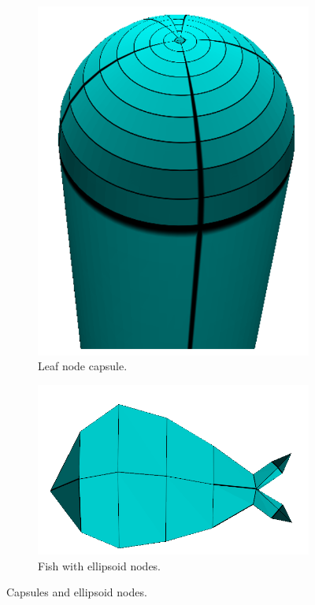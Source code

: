 \begin{figure}[h]
        \centering
        \begin{subfigure}[b]{0.25\textwidth}
        	\centering
                \includegraphics[height=\textwidth]{images/capsule.png}
                \caption{Leaf node capsule.}
                \label{fig:caps}
        \end{subfigure}%
        \qquad %
        \begin{subfigure}[b]{0.4\textwidth}
        	\centering
                \includegraphics[width=\textwidth]{images/ryba_mesh.png}
                \caption{Fish with ellipsoid nodes.}
                \label{fig:fish}
        \end{subfigure}
        \caption[Capsules and ellipsoid nodes]{Capsules and ellipsoid nodes.}\label{fig:caps_ell}
\end{figure}

